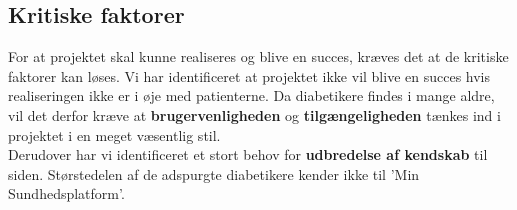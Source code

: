 \subsection{Kritiske faktorer}
For at projektet skal kunne realiseres og blive en succes, kræves det at de kritiske faktorer kan løses. Vi har identificeret at projektet ikke vil blive en succes hvis realiseringen ikke er i øje med patienterne. Da diabetikere findes i mange aldre, vil det derfor kræve at \textbf{brugervenligheden} og \textbf{tilgængeligheden} tænkes ind i projektet i en meget væsentlig stil.\\
Derudover har vi identificeret et stort behov for \textbf{udbredelse af kendskab} til siden. Størstedelen af de adspurgte diabetikere kender ikke til 'Min Sundhedsplatform'. 